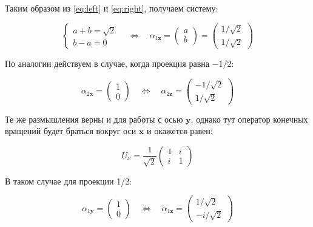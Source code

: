\documentclass[a4paper, 12pt]{article}
\newcommand{\qlrq}
{\ensuremath{\quad \Leftrightarrow \quad}} %
\begin{document}
Таким образом из \ref{eq:left} и \ref{eq:right}, получаем систему:

\begin{equation}
	\begin{cases}
		a + b = \sqrt{2}\\
		b - a = 0
	\end{cases}
	\qlrq 	\boxed{\alpha_{1\mathbf{z}} = 
	\begin{pmatrix}
	a \\
	b
	\end{pmatrix}
	= 
	\begin{pmatrix}
		1/\sqrt{2}\\
		1/\sqrt{2}
	\end{pmatrix}}
\end{equation}

По аналогии действуем в случае, когда проекция равна $-1/2$:

\begin{equation}
	\alpha_{2\mathbf{x}} = 
	\begin{pmatrix}
	1\\
	0
	\end{pmatrix}
	\qlrq \boxed{\alpha_{2\mathbf{z}} = 
	\begin{pmatrix}
	-1/\sqrt{2}\\
	1/\sqrt{2}
	\end{pmatrix}}
\end{equation}

Те же размышления верны и для работы с осью $\mathbf{y}$, однако тут оператор конечных вращений будет браться вокруг оси $\mathbf{x}$ и окажется равен:

\begin{equation*}
	U_x = \frac{1}{\sqrt{2}}
	\begin{pmatrix}
		1 & i\\
		i & 1
	\end{pmatrix}
\end{equation*}

В таком случае для проекции 1/2:

\begin{equation}
	\alpha_{1\mathbf{y}} = 
	\begin{pmatrix}
	1\\
	0
	\end{pmatrix}
	\qlrq \boxed{\alpha_{1\mathbf{z}} = 
	\begin{pmatrix}
	 1 / \sqrt{2}\\
	 -i / \sqrt{2}
	\end{pmatrix}}
\end{equation}
\end{document}

